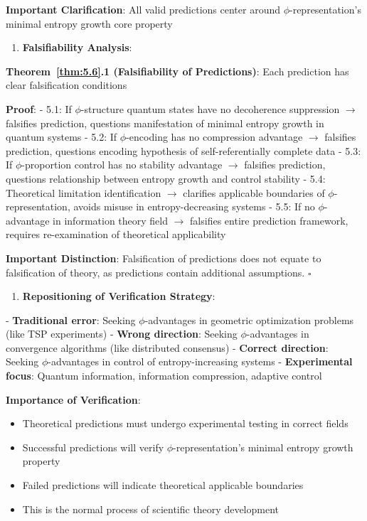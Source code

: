    \textbf{Important Clarification}: All valid predictions center around $\phi$-representation's minimal entropy growth core property

\begin{enumerate}
\item \textbf{Falsifiability Analysis}:
\end{enumerate}
   \textbf{Theorem~\ref{thm:5.6}.1 (Falsifiability of Predictions)}: Each prediction has clear falsification conditions
\label{thm:5.6}
   
   \textbf{Proof}:
   - 5.1: If $\phi$-structure quantum states have no decoherence suppression $\rightarrow$ falsifies prediction, questions manifestation of minimal entropy growth in quantum systems
   - 5.2: If $\phi$-encoding has no compression advantage $\rightarrow$ falsifies prediction, questions encoding hypothesis of self-referentially complete data
   - 5.3: If $\phi$-proportion control has no stability advantage $\rightarrow$ falsifies prediction, questions relationship between entropy growth and control stability
   - 5.4: Theoretical limitation identification $\rightarrow$ clarifies applicable boundaries of $\phi$-representation, avoids misuse in entropy-decreasing systems
   - 5.5: If no $\phi$-advantage in information theory field $\rightarrow$ falsifies entire prediction framework, requires re-examination of theoretical applicability
   
   \textbf{Important Distinction}: Falsification of predictions does not equate to falsification of theory, as predictions contain additional assumptions. $\square$

\begin{enumerate}
\item \textbf{Repositioning of Verification Strategy}:
\end{enumerate}
   - \textbf{Traditional error}: Seeking $\phi$-advantages in geometric optimization problems (like TSP experiments)
   - \textbf{Wrong direction}: Seeking $\phi$-advantages in convergence algorithms (like distributed consensus)
   - \textbf{Correct direction}: Seeking $\phi$-advantages in control of entropy-increasing systems
   - \textbf{Experimental focus}: Quantum information, information compression, adaptive control

\textbf{Importance of Verification}:

\begin{itemize}
\item Theoretical predictions must undergo experimental testing in correct fields
\item Successful predictions will verify $\phi$-representation's minimal entropy growth property
\item Failed predictions will indicate theoretical applicable boundaries
\item This is the normal process of scientific theory development
\end{itemize}


